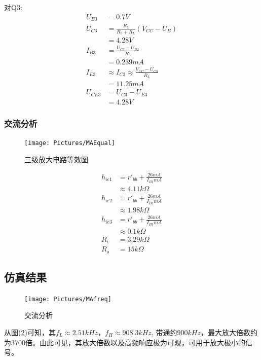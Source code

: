 \documentclass[11pt,a4paper,UTF8]{ctexart}
\begin{document}
			对Q3:
			\begin{align}
				U_{B3} &= 0.7V \nonumber\\
				U_{C3} &= \frac{R_5}{R_5+R_L}(V_{CC} - U_B) \nonumber\\
				&= 4.28V \nonumber\\
				I_{B3} &= \frac{U_{C3} - U_{B2}}{R_5} \nonumber\\
				&= 0.239mA \nonumber\\
				I_{E3} &\approx I_{C3} \approx \frac{V_{CC}- U_{C3}}{R_L} \nonumber\\
				&= 11.25mA \nonumber\\
				U_{CE3} &= U_{C3} - U_{E3} \nonumber\\
				&= 4.28V \nonumber
			\end{align}
			\subsubsection{交流分析}
			\begin{figure}[H]
				\centering
				\texttt{[image: Pictures/MAEqual]}
				\caption{三级放大电路等效图}
				\label{fig:maequal}
			\end{figure}
			
			\begin{align}
				h_{ie1} &= r'_{bb} + \frac{26mA}{I_{B1}mA} \nonumber\\
				&\approx 4.11k\Omega{} \nonumber\\
				h_{ie2} &= r'_{bb} + \frac{26mA}{I_{B2}mA} \nonumber\\
				&\approx 1.98k\Omega{} \nonumber\\
				h_{ie3} &= r'_{bb} + \frac{26mA}{I_{B3}mA} \nonumber\\
				&\approx 0.1k\Omega{} \nonumber\\
				R_i &= 3.29k\Omega \\
				R_o &= 15k\Omega
			\end{align}
		\subsection{仿真结果}
		\begin{figure}[H]
			\centering
			\texttt{[image: Pictures/MAfreq]}
			\caption{交流分析}
			\label{fig:mafreq}
		\end{figure}
		
		从图(\ref{fig:mafreq})可知，其$ f_L \approx 2.51kHz $，$ f_H \approx 908.3kHz $, 带通约$ 900kHz $，最大放大倍数约为3700倍。由此可见，其放大倍数以及高频响应极为可观，可用于放大极小的信号。
	\newpage
\end{document}
